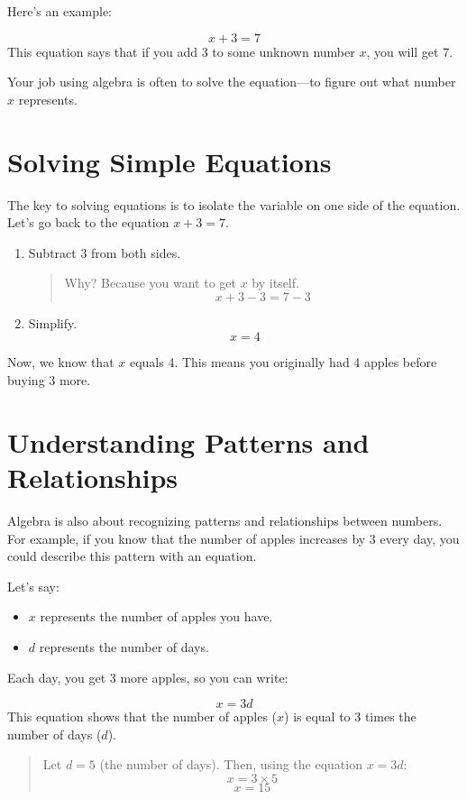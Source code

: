 Here’s an example:

\[ x + 3 = 7 \]
This equation says that if you add 3 to some unknown number $x$, you will get 7.

Your job using algebra is often to solve the equation—to figure out what number $x$ represents.

\section{Solving Simple Equations}
The key to solving equations is to isolate the variable on one side of the equation. Let’s go back to the equation $x + 3 = 7$.

\begin{enumerate}
    \item Subtract 3 from both sides.
    \begin{quote}
    Why? Because you want to get $x$ by itself.
    \[ x + 3 - 3 = 7 - 3 \]
    \end{quote}
    \item Simplify.
    \[ x = 4 \]
\end{enumerate}

Now, we know that $x$ equals 4. This means you originally had 4 apples before buying 3 more.

\section{Understanding Patterns and Relationships}
Algebra is also about recognizing patterns and relationships between numbers. For example, if you know that the number of apples increases by 3 every day, you could describe this pattern with an equation.

Let’s say:

\begin{itemize}
    \item $x$ represents the number of apples you have.
    \item $d$ represents the number of days.
\end{itemize}

Each day, you get 3 more apples, so you can write:

\[ x = 3d \]
This equation shows that the number of apples ($x$) is equal to 3 times the number of days ($d$).
\begin{quote}
    Let $d = 5$ (the number of days).
    Then, using the equation $x = 3d$:
    \[ x = 3 \times 5 \]
    \[ x = 15 \]
\end{quote}

